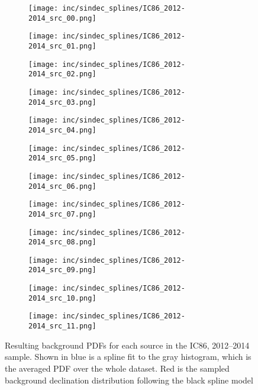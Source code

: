 \begin{figure}[htbp] %
  \centering
  \begin{subfigure}[c]{0.24\textwidth}
    \texttt{[image: inc/sindec\_splines/IC86\_2012-2014\_src\_00.png]}
  \end{subfigure}
  \hfill
  \begin{subfigure}[c]{0.24\textwidth}
    \texttt{[image: inc/sindec\_splines/IC86\_2012-2014\_src\_01.png]}
  \end{subfigure}
  \hfill
  \begin{subfigure}[c]{0.24\textwidth}
    \texttt{[image: inc/sindec\_splines/IC86\_2012-2014\_src\_02.png]}
  \end{subfigure}
  \hfill
  \begin{subfigure}[c]{0.24\textwidth}
    \texttt{[image: inc/sindec\_splines/IC86\_2012-2014\_src\_03.png]}
  \end{subfigure}

  \begin{subfigure}[c]{0.24\textwidth}
    \texttt{[image: inc/sindec\_splines/IC86\_2012-2014\_src\_04.png]}
  \end{subfigure}
  \hfill
  \begin{subfigure}[c]{0.24\textwidth}
    \texttt{[image: inc/sindec\_splines/IC86\_2012-2014\_src\_05.png]}
  \end{subfigure}
  \hfill
  \begin{subfigure}[c]{0.24\textwidth}
    \texttt{[image: inc/sindec\_splines/IC86\_2012-2014\_src\_06.png]}
  \end{subfigure}
  \hfill
  \begin{subfigure}[c]{0.24\textwidth}
    \texttt{[image: inc/sindec\_splines/IC86\_2012-2014\_src\_07.png]}
  \end{subfigure}

  \begin{subfigure}[c]{0.24\textwidth}
    \texttt{[image: inc/sindec\_splines/IC86\_2012-2014\_src\_08.png]}
  \end{subfigure}
  \hfill
  \begin{subfigure}[c]{0.24\textwidth}
    \texttt{[image: inc/sindec\_splines/IC86\_2012-2014\_src\_09.png]}
  \end{subfigure}
  \hfill
  \begin{subfigure}[c]{0.24\textwidth}
    \texttt{[image: inc/sindec\_splines/IC86\_2012-2014\_src\_10.png]}
  \end{subfigure}
  \hfill
  \begin{subfigure}[c]{0.24\textwidth}
    \texttt{[image: inc/sindec\_splines/IC86\_2012-2014\_src\_11.png]}
  \end{subfigure}

  \caption{Resulting background PDFs for each source in the IC86, 2012--2014 sample. Shown in blue is a spline fit to the gray histogram, which is the averaged PDF over the whole dataset. Red is the sampled background declination distribution following the black spline model}
  \label{fig:model_bg_pdfs}
\end{figure}


